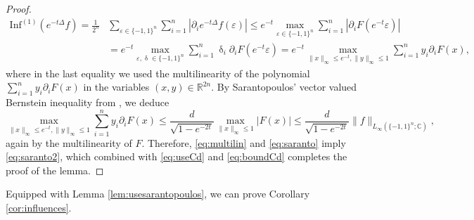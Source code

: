 \documentclass[11pt,reqno]{amsart}
\renewcommand{\leq}{\leqslant}
\newcommand{\e}{\varepsilon}
\newcommand{\R}{\mathbb R}
\newcommand{\1}{\mathbf 1}
\theoremstyle{remark}
\newcommand{\C}{\mathbb C}
\renewcommand{\delta}{\updelta}
\begin{document}
\begin{proof}
\begin{equation} \label{eq:multilin}
\begin{split}
\mathrm{Inf}^{(1)}(e^{-t\Delta}f) = \frac{1}{2^n} & \sum_{\e\in\{-1,1\}^n} \sum_{i=1}^n |\partial_i e^{-t\Delta}f(\e)| \leq e^{-t} \max_{\e\in\{-1,1\}^n} \sum_{i=1}^n |\partial_i F(e^{-t}\e)|
\\& = e^{-t} \max_{\e,\delta\in\{-1,1\}^n} \sum_{i=1}^n \delta_i \partial_i F(e^{-t}\e) = e^{-t} \max_{\|x\|_\infty \leq e^{-t}, \|y\|_\infty \leq 1} \sum_{i=1}^n y_i \partial_i F(x),
\end{split}
\end{equation}
where in the last equality we used the multilinearity of the polynomial $\sum_{i=1}^n y_i \partial_i F(x)$ in the variables $(x,y)\in\R^{2n}$. By Sarantopoulos' vector valued Bernstein inequality from \cite{Sar91}, we deduce
\begin{equation} \label{eq:saranto}
\max_{\|x\|_\infty\leq e^{-t}, \|y\|_\infty \leq 1} \sum_{i=1}^n y_i \partial_i F(x) \leq \frac{d}{\sqrt{1-e^{-2t}}} \max_{\|x\|_\infty \leq 1} |F(x)| \leq \frac{d}{\sqrt{1-e^{-2t}}} \|f\|_{L_\infty(\{-1,1\}^n;\C)},
\end{equation}
again by the multilinearity of $F$. Therefore, \eqref{eq:multilin} and \eqref{eq:saranto} imply \eqref{eq:saranto2}, which combined with \eqref{eq:useCd} and \eqref{eq:boundCd} completes the proof of the lemma.
\end{proof}

Equipped with Lemma \ref{lem:usesarantopoulos}, we can prove Corollary \ref{cor:influences}.

\medskip
\end{document}
